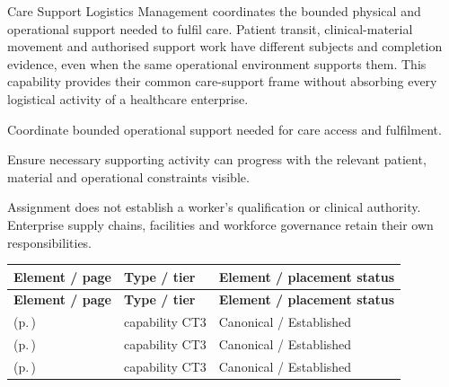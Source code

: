 Care Support Logistics Management coordinates the bounded physical and operational support needed to fulfil care. Patient transit, clinical-material movement and authorised support work have different subjects and completion evidence, even when the same operational environment supports them. This capability provides their common care-support frame without absorbing every logistical activity of a healthcare enterprise.



Coordinate bounded operational support needed for care access and fulfilment.



Ensure necessary supporting activity can progress with the relevant patient, material and operational constraints visible.



Assignment does not establish a worker's qualification or clinical authority. Enterprise supply chains, facilities and workforce governance retain their own responsibilities.


\begingroup\small\setlength{\TableWidth}{\dimexpr\linewidth-6\tabcolsep-4\arrayrulewidth\relax}
\begin{longtable}{|>{\raggedright\arraybackslash}p{0.52\TableWidth}|>{\raggedright\arraybackslash}p{0.2\TableWidth}|>{\raggedright\arraybackslash}p{0.28\TableWidth}|}
\hline\rowcolor{TableHead}\textbf{Element / page} & \textbf{Type / tier} & \textbf{Element / placement status}\\\hline\endfirsthead
\hline\rowcolor{TableHead}\textbf{Element / page} & \textbf{Type / tier} & \textbf{Element / placement status}\\\hline\endhead
\hline\endfoot
\nameref{cap:bc-patient-movement-coordination} (p.\,\pageref{cap:bc-patient-movement-coordination}) & capability CT3 & Canonical / Established\\\hline
\nameref{cap:bc-clinical-material-logistics-coordination} (p.\,\pageref{cap:bc-clinical-material-logistics-coordination}) & capability CT3 & Canonical / Established\\\hline
\nameref{cap:bc-care-support-work-coordination} (p.\,\pageref{cap:bc-care-support-work-coordination}) & capability CT3 & Canonical / Established\\\hline
\end{longtable}\endgroup

